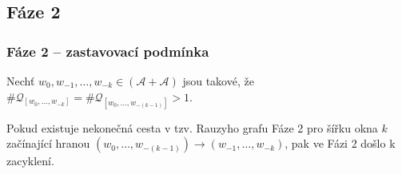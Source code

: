 \documentclass[11pt]{beamer}
\newcommand{\A}{\mathcal{A}}
\newcommand{\Q}{\mathcal{Q}}
\begin{document}
\subsection{Fáze 2}
\begin{frame}
\frametitle{Fáze 2 -- zastavovací podmínka}
%

Nechť $w_0,w_{-1},\dots, w_{-k}\in(\A+\A)$ jsou takové, že $\#\Q_{[w_{0},\dots, w_{-k}]}=\#\Q_{[w_{0},\dots, w_{-(k-1)}]}>1$. 

\vspace{1cm}
Pokud existuje nekonečná cesta v tzv. Rauzyho grafu Fáze 2 pro šířku okna $k$ začínající hranou $(w_{0}, \dots ,w_{-(k-1)})\rightarrow (w_{-1}, \dots ,w_{-k})$, pak ve Fázi 2 došlo k zacyklení.
\end{frame}
\end{document}
